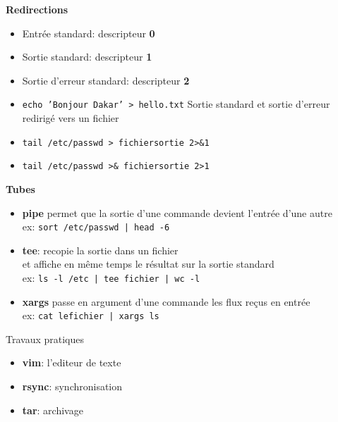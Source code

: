 \documentclass[french]{beamer}
\begin{document}
\begin{frame}
\textbf{Redirections} \\
    \begin{itemize}
    \item Entrée standard: descripteur \textbf{0}
    \item Sortie standard: descripteur \textbf{1}
    \item Sortie d'erreur standard: descripteur \textbf{2}
    \item \texttt{echo 'Bonjour Dakar' > hello.txt}
    Sortie standard et sortie d'erreur redirigé vers un fichier
    \item \texttt{tail /etc/passwd > fichiersortie 2>\&1 }
    \item \texttt{tail /etc/passwd >\& fichiersortie 2>1 }
    \end{itemize}
\end{frame}


\begin{frame}
\textbf{Tubes}
    \begin{itemize}
    \item \textbf{pipe} permet que la sortie d'une commande devient l'entrée
    d'une autre \\
    ex: \texttt{sort /etc/passwd | head -6}
    \item \textbf{tee}: recopie la sortie dans un fichier \\et affiche en même
    temps le résultat sur la sortie standard \\
    ex: \texttt{ls -l /etc | tee fichier | wc  -l}
    \item \textbf{xargs} passe en argument d'une commande les flux reçus en
    entrée\\
    ex: \texttt{cat lefichier | xargs ls}

    \end{itemize}
\end{frame}



\begin{frame}
\begin{center}
Travaux pratiques
\begin{itemize}
\item \textbf{vim}: l'editeur de texte
\item \textbf{rsync}: synchronisation
\item \textbf{tar}: archivage
\end{itemize}
\end{center}
\end{frame}
\end{document}
